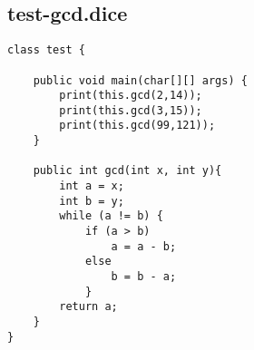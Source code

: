 \subsection{test-gcd.dice}
\begin{verbatim}
class test {

	public void main(char[][] args) {
		print(this.gcd(2,14));
		print(this.gcd(3,15));
		print(this.gcd(99,121));
	}

	public int gcd(int x, int y){
		int a = x;
		int b = y;
  		while (a != b) {
    		if (a > b)
    			a = a - b;
    		else 
    			b = b - a;
  			}
  		return a;
	}
}

\end{verbatim}